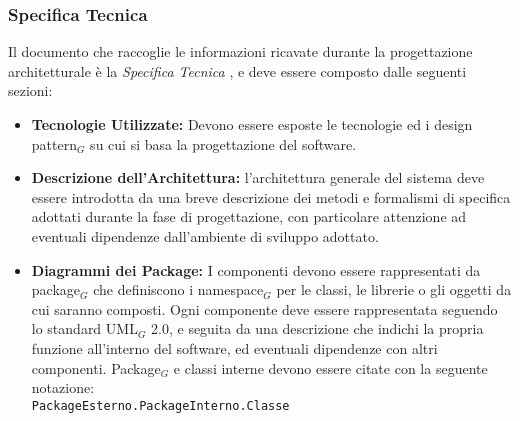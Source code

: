 \subsubsection{Specifica Tecnica}
Il documento che raccoglie le informazioni ricavate durante la progettazione architetturale è la \textit{Specifica Tecnica} , e deve essere composto dalle seguenti sezioni:
\begin{itemize}
\item \textbf{Tecnologie Utilizzate:} Devono essere esposte le tecnologie ed i design pattern$_G$ su cui si basa la progettazione del software.
\item \textbf{Descrizione dell'Architettura:} l'architettura generale del sistema deve essere introdotta da una breve descrizione dei metodi e formalismi di specifica adottati durante la fase di progettazione, con particolare attenzione ad eventuali dipendenze dall'ambiente di sviluppo adottato.
\item \textbf{Diagrammi dei Package:} I componenti devono essere rappresentati da package$_G$ che definiscono i namespace$_G$ per le classi, le librerie o gli oggetti da cui saranno composti. Ogni componente deve essere rappresentata seguendo lo standard UML$_G$ 2.0, e seguita da una descrizione che indichi la propria funzione all'interno del software, ed eventuali dipendenze con altri componenti. Package$_G$ e classi interne devono essere citate con la seguente notazione: \\
\verb|PackageEsterno.PackageInterno.Classe|


\end{itemize}
